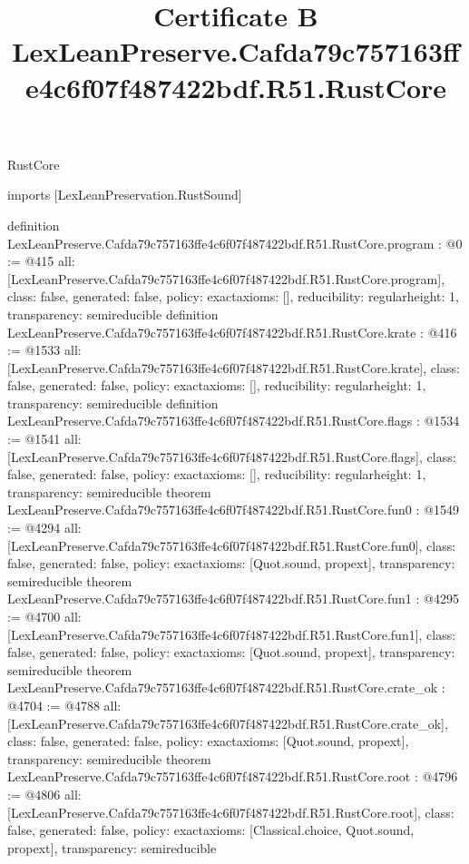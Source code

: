 \begin{lexlean}{RustCore}
\title{Certificate B LexLeanPreserve.Cafda79c757163ffe4c6f07f487422bdf.R51.RustCore}
\begin{coremodule}
imports [LexLeanPreservation.RustSound]

definition LexLeanPreserve.Cafda79c757163ffe4c6f07f487422bdf.R51.RustCore.program : @0 := @415 {
  all: [LexLeanPreserve.Cafda79c757163ffe4c6f07f487422bdf.R51.RustCore.program],
  class: false,
  generated: false,
  policy: exact{axioms: []},
  reducibility: regular{height: 1},
  transparency: semireducible
}
definition LexLeanPreserve.Cafda79c757163ffe4c6f07f487422bdf.R51.RustCore.krate : @416 := @1533 {
  all: [LexLeanPreserve.Cafda79c757163ffe4c6f07f487422bdf.R51.RustCore.krate],
  class: false,
  generated: false,
  policy: exact{axioms: []},
  reducibility: regular{height: 1},
  transparency: semireducible
}
definition LexLeanPreserve.Cafda79c757163ffe4c6f07f487422bdf.R51.RustCore.flags : @1534 := @1541 {
  all: [LexLeanPreserve.Cafda79c757163ffe4c6f07f487422bdf.R51.RustCore.flags],
  class: false,
  generated: false,
  policy: exact{axioms: []},
  reducibility: regular{height: 1},
  transparency: semireducible
}
theorem LexLeanPreserve.Cafda79c757163ffe4c6f07f487422bdf.R51.RustCore.fun0 : @1549 := @4294 {
  all: [LexLeanPreserve.Cafda79c757163ffe4c6f07f487422bdf.R51.RustCore.fun0],
  class: false,
  generated: false,
  policy: exact{axioms: [Quot.sound, propext]},
  transparency: semireducible
}
theorem LexLeanPreserve.Cafda79c757163ffe4c6f07f487422bdf.R51.RustCore.fun1 : @4295 := @4700 {
  all: [LexLeanPreserve.Cafda79c757163ffe4c6f07f487422bdf.R51.RustCore.fun1],
  class: false,
  generated: false,
  policy: exact{axioms: [Quot.sound, propext]},
  transparency: semireducible
}
theorem LexLeanPreserve.Cafda79c757163ffe4c6f07f487422bdf.R51.RustCore.crate_ok : @4704 := @4788 {
  all: [LexLeanPreserve.Cafda79c757163ffe4c6f07f487422bdf.R51.RustCore.crate_ok],
  class: false,
  generated: false,
  policy: exact{axioms: [Quot.sound, propext]},
  transparency: semireducible
}
theorem LexLeanPreserve.Cafda79c757163ffe4c6f07f487422bdf.R51.RustCore.root : @4796 := @4806 {
  all: [LexLeanPreserve.Cafda79c757163ffe4c6f07f487422bdf.R51.RustCore.root],
  class: false,
  generated: false,
  policy: exact{axioms: [Classical.choice, Quot.sound, propext]},
  transparency: semireducible
}


\end{coremodule}
\end{lexlean}
